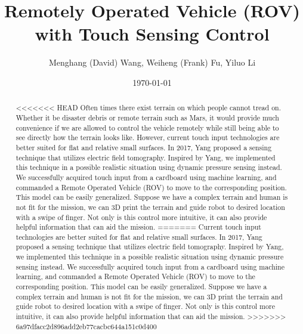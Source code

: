 \documentclass[reprint,amsmath, amsfonts, amssymb, aps, letterpaper]{revtex4-1}
\begin{document}
\title{Remotely Operated Vehicle (ROV) with Touch Sensing Control}
\author{Menghang (David) Wang, Weiheng (Frank) Fu, Yiluo Li}

\date{\today}



\begin{abstract}
<<<<<<< HEAD
Often times there exist terrain on which people cannot tread on. Whether it be disaster debris or remote terrain such as Mars, it would provide much convenience if we are allowed to control the vehicle remotely while still being able to see directly how the terrain looks like. However, current touch input technologies are better suited for flat and relative small surfaces. In 2017, Yang \citep{electrick} proposed a sensing technique that utilizes electric field tomography. Inspired by Yang, we implemented this technique in a possible realistic situation using dynamic pressure sensing instead. We successfully acquired touch input from a cardboard using machine learning, and commanded a Remote Operated Vehicle (ROV) to move to the corresponding position. This model can be easily generalized. Suppose we have a complex terrain and human is not fit for the mission, we can 3D print the terrain and guide robot to desired location with a swipe of finger. Not only is this control more intuitive, it can also provide helpful information that can aid the mission.
=======
Current touch input technologies are better suited for flat and relative small surfaces. In 2017, Yang \citep{electrick} proposed a sensing technique that utilizes electric field tomography. Inspired by Yang, we implemented this technique in a possible realistic situation using dynamic pressure sensing instead. We successfully acquired touch input from a cardboard using machine learning, and commanded a Remote Operated Vehicle (ROV) to move to the corresponding position. This model can be easily generalized. Suppose we have a complex terrain and human is not fit for the mission, we can 3D print the terrain and guide robot to desired location with a swipe of finger. Not only is this control more intuitive, it can also provide helpful information that can aid the mission.
>>>>>>> 6a97dfacc2d896add2eb77cacbc644a151c0d400
\end{abstract}
\end{document}

